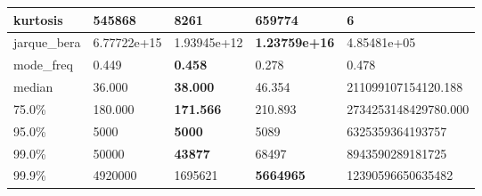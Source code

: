 \begin{table}[H]
\begin{tabular}{|l|m{10em}|m{10em}|m{10em}|m{10em}|}
\hline kurtosis & 545868 & 8261 & \bfseries 659774 & \cellcolor[rgb]{0.9, 0.54, 0.52} 6 \\
\hline jarque\_bera & 6.77722e+15 & 1.93945e+12 & \bfseries 1.23759e+16 & \cellcolor[rgb]{0.9, 0.54, 0.52} 4.85481e+05 \\
\hline mode\_freq & 0.449 & \bfseries 0.458 & \cellcolor[rgb]{0.9, 0.54, 0.52} 0.278 & 0.478 \\
\hline median & 36.000 & \bfseries 38.000 & 46.354 & \cellcolor[rgb]{0.9, 0.54, 0.52} 211099107154120.188 \\
\hline 75.0\% & 180.000 & \bfseries 171.566 & 210.893 & \cellcolor[rgb]{0.9, 0.54, 0.52} 2734253148429780.000 \\
\hline 95.0\% & 5000 & \bfseries 5000 & 5089 & \cellcolor[rgb]{0.9, 0.54, 0.52} 6325359364193757 \\
\hline 99.0\% & 50000 & \bfseries 43877 & 68497 & \cellcolor[rgb]{0.9, 0.54, 0.52} 8943590289181725 \\
\hline 99.9\% & 4920000 & 1695621 & \bfseries 5664965 & \cellcolor[rgb]{0.9, 0.54, 0.52} 12390596650635482 \\
\hline
\end{tabular}
\end{table}
